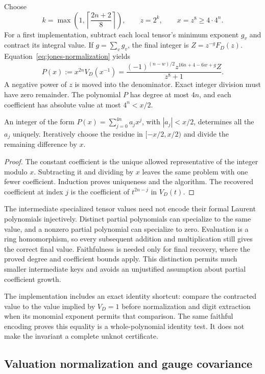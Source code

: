 Choose
\[
 k=\max\!\left(1,\left\lceil\frac{2n+2}{8}\right\rceil\right),
 \qquad z=2^k,\qquad x=z^8\geq4\cdot4^n.
\]
For a first implementation, subtract each local tensor's minimum exponent
$g_v$ and contract its integral value. If $g=\sum_v g_v$, the final integer
is $Z=z^{-g}F_D(z)$. Equation~\eqref{eq:jones-normalization} yields
\begin{equation}
 P(x):=x^{2n}V_D(x^{-1})=
 \frac{(-1)^{(n-w)/2}z^{16n+4-6w+g}Z}{z^8+1}.
 \label{eq:integer-jones}
\end{equation}
A negative power of $z$ is moved into the denominator. Exact integer division
must have zero remainder. The polynomial $P$ has degree at most $4n$, and
each coefficient has absolute value at most $4^n<x/2$.

\begin{lemma}
An integer of the form $P(x)=\sum_{j=0}^{4n}a_jx^j$, with
$|a_j|<x/2$, determines all the $a_j$ uniquely. Iteratively choose the
residue in $[-x/2,x/2)$ and divide the remaining difference by $x$.
\end{lemma}
\begin{proof}
The constant coefficient is the unique allowed representative of the
integer modulo $x$. Subtracting it and dividing by $x$ leaves the same
problem with one fewer coefficient. Induction proves uniqueness and the
algorithm. The recovered coefficient at index $j$ is the coefficient of
$t^{2n-j}$ in $V_D(t)$.
\end{proof}

The intermediate specialized tensor values need not encode their formal
Laurent polynomials injectively. Distinct partial polynomials can specialize
to the same value, and a nonzero partial polynomial can specialize to zero.
Evaluation is a ring homomorphism, so every subsequent addition and
multiplication still gives the correct final value. Faithfulness is needed
only for final recovery, where the proved degree and coefficient bounds
apply. This distinction permits much smaller intermediate keys and avoids
an unjustified assumption about partial coefficient growth.

The implementation includes an exact identity shortcut: compare the
contracted value to the value implied by $V_D=1$ before normalization and
digit extraction when its monomial exponent permits that comparison. The
same faithful encoding proves this equality is a whole-polynomial identity
test. It does not make the invariant a complete unknot certificate.

\subsection{Valuation normalization and gauge covariance}

